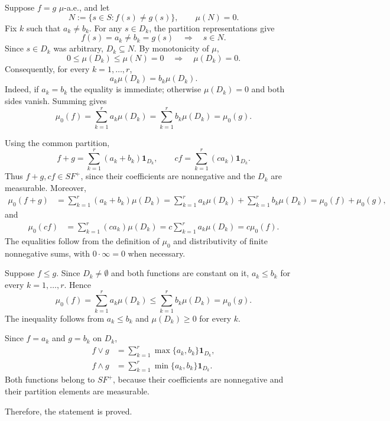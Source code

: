Suppose $f=g$ $\mu$-a.e., and let
\[
N:=\{s\in S:f(s)\ne g(s)\},\qquad \mu(N)=0.
\]
Fix $k$ such that $a_k\ne b_k$. For any $s\in D_k$, the partition representations give
\[
f(s)=a_k\ne b_k=g(s)\quad\Longrightarrow\quad s\in N.
\]
Since $s\in D_k$ was arbitrary, $D_k\subseteq N$. By monotonicity of $\mu$,
\[
0\le\mu(D_k)\le\mu(N)=0
\quad\Longrightarrow\quad \mu(D_k)=0.
\]
Consequently, for every $k=1,\ldots,r$,
\[
a_k\mu(D_k)=b_k\mu(D_k).
\]
Indeed, if $a_k=b_k$ the equality is immediate; otherwise $\mu(D_k)=0$ and both sides vanish. Summing gives
\[
\mu_0(f)=\sum_{k=1}^{r}a_k\mu(D_k)
=\sum_{k=1}^{r}b_k\mu(D_k)=\mu_0(g).
\]

Using the common partition,
\[
f+g=\sum_{k=1}^{r}(a_k+b_k)\mathbf1_{D_k},\qquad
cf=\sum_{k=1}^{r}(ca_k)\mathbf1_{D_k}.
\]
Thus $f+g,cf\in SF^+$, since their coefficients are nonnegative and the $D_k$ are measurable. Moreover,
\[
\begin{aligned}
\mu_0(f+g)&=\sum_{k=1}^{r}(a_k+b_k)\mu(D_k) =\sum_{k=1}^{r}a_k\mu(D_k)
 +\sum_{k=1}^{r}b_k\mu(D_k) =\mu_0(f)+\mu_0(g),
\end{aligned}
\]
and
\[
\begin{aligned}
\mu_0(cf)&=\sum_{k=1}^{r}(ca_k)\mu(D_k) =c\sum_{k=1}^{r}a_k\mu(D_k)
=c\mu_0(f).
\end{aligned}
\]
The equalities follow from the definition of $\mu_0$ and distributivity of finite nonnegative sums, with $0\cdot\infty=0$ when necessary.

Suppose $f\le g$. Since $D_k\ne\emptyset$ and both functions are constant on it, $a_k\le b_k$ for every $k=1,\ldots,r$. Hence
\[
\mu_0(f)=\sum_{k=1}^{r}a_k\mu(D_k)
\le\sum_{k=1}^{r}b_k\mu(D_k)=\mu_0(g).
\]
The inequality follows from $a_k\le b_k$ and $\mu(D_k)\ge0$ for every $k$.

Since $f=a_k$ and $g=b_k$ on $D_k$,
\[
\begin{aligned}
f\vee g&=\sum_{k=1}^{r}\max\{a_k,b_k\}\mathbf1_{D_k},\\
f\wedge g&=\sum_{k=1}^{r}\min\{a_k,b_k\}\mathbf1_{D_k}.
\end{aligned}
\]
Both functions belong to $SF^+$, because their coefficients are nonnegative and their partition elements are measurable.

Therefore, the statement is proved.
